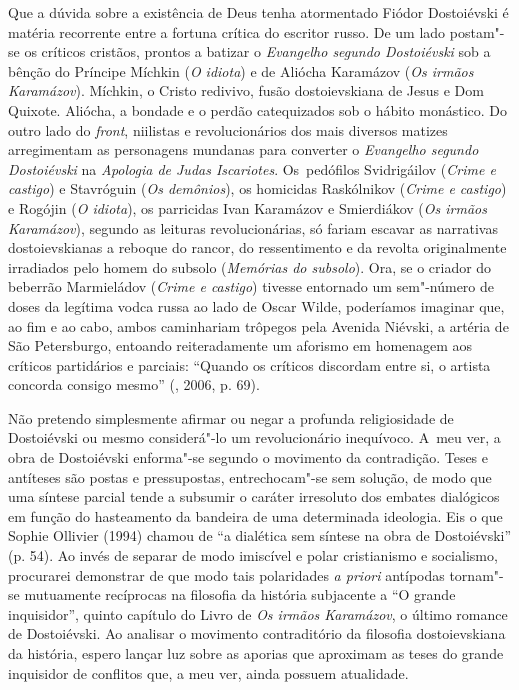 Que a dúvida sobre a existência de Deus tenha atormentado Fiódor
Dostoiévski é matéria recorrente entre a fortuna crítica do escritor
russo. De um lado postam"-se os críticos cristãos, prontos a batizar o
\emph{Evangelho segundo Dostoiévski} sob a bênção do Príncipe Míchkin
(\emph{O idiota}) e de Aliócha Karamázov (\emph{Os irmãos Karamázov}).
Míchkin, o Cristo redivivo, fusão dostoievskiana de Jesus e Dom Quixote.
Aliócha, a bondade e o perdão catequizados sob o hábito monástico. Do
outro lado do \emph{front}, niilistas e revolucionários dos mais
diversos matizes arregimentam as personagens mundanas para converter o
\emph{Evangelho segundo Dostoiévski} na \emph{Apologia de Judas
Iscariotes}. Os~pedófilos Svidrigáilov (\emph{Crime e castigo}) e
Stavróguin (\emph{Os demônios}), os homicidas Raskólnikov (\emph{Crime e
castigo}) e Rogójin (\emph{O idiota}), os parricidas Ivan Karamázov e
Smierdiákov (\emph{Os irmãos Karamázov}), segundo as leituras
revolucionárias, só fariam escavar as narrativas dostoievskianas a
reboque do rancor, do ressentimento e da revolta originalmente
irradiados pelo homem do subsolo (\emph{Memórias do subsolo}). Ora, se o
criador do beberrão Marmieládov (\emph{Crime e castigo}) tivesse
entornado um sem"-número de doses da legítima vodca russa ao lado de
Oscar Wilde, poderíamos imaginar que, ao fim e ao cabo, ambos
caminhariam trôpegos pela Avenida Niévski, a artéria de São Petersburgo,
entoando reiteradamente um aforismo em homenagem aos críticos
partidários e parciais: ``Quando os críticos discordam entre si, o
artista concorda consigo mesmo'' (, 2006, p. 69).

Não pretendo simplesmente afirmar ou negar a profunda religiosidade de
Dostoiévski ou mesmo considerá"-lo um revolucionário inequívoco. A~meu
ver, a obra de Dostoiévski enforma"-se segundo o movimento da
contradição. Teses e antíteses são postas e pressupostas, entrechocam"-se
sem solução, de modo que uma síntese parcial tende a subsumir o caráter
irresoluto dos embates dialógicos em função do hasteamento da bandeira
de uma determinada ideologia. Eis o que Sophie Ollivier (1994) chamou de
``a dialética sem síntese na obra de Dostoiévski'' (p. 54). Ao invés de
separar de modo imiscível e polar cristianismo e socialismo, procurarei
demonstrar de que modo tais polaridades \emph{a priori} antípodas
tornam"-se mutuamente recíprocas na filosofia da história subjacente a
``O grande inquisidor'', quinto capítulo do Livro  de \emph{Os irmãos
Karamázov}, o último romance de Dostoiévski. Ao analisar o movimento
contraditório da filosofia dostoievskiana da história, espero lançar luz
sobre as aporias que aproximam as teses do grande inquisidor de
conflitos que, a meu ver, ainda possuem atualidade.

